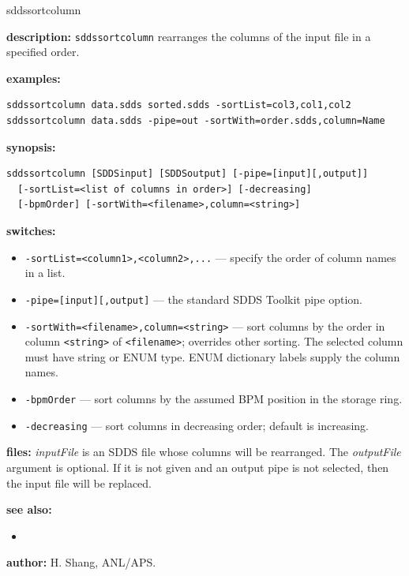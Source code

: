 \begin{sddsprog}{sddssortcolumn}
  \item \textbf{description:}
    \verb|sddssortcolumn| rearranges the columns of the input file in a specified order.
  \item \textbf{examples:}
    \begin{verbatim}
sddssortcolumn data.sdds sorted.sdds -sortList=col3,col1,col2
sddssortcolumn data.sdds -pipe=out -sortWith=order.sdds,column=Name
    \end{verbatim}
  \item \textbf{synopsis:}
    \begin{verbatim}
sddssortcolumn [SDDSinput] [SDDSoutput] [-pipe=[input][,output]]
  [-sortList=<list of columns in order>] [-decreasing]
  [-bpmOrder] [-sortWith=<filename>,column=<string>]
    \end{verbatim}
  \item \textbf{switches:}
    \begin{itemize}
      \item \verb|-sortList=<column1>,<column2>,...| --- specify the order of column names in a list.
      \item \verb|-pipe=[input][,output]| --- the standard SDDS Toolkit pipe option.
      \item \verb|-sortWith=<filename>,column=<string>| --- sort columns by the order in column \verb|<string>| of \verb|<filename>|; overrides other sorting. The selected column must have string or ENUM type. ENUM dictionary labels supply the column names.
      \item \verb|-bpmOrder| --- sort columns by the assumed BPM position in the storage ring.
      \item \verb|-decreasing| --- sort columns in decreasing order; default is increasing.
    \end{itemize}
  \item \textbf{files:}
    \emph{inputFile} is an SDDS file whose columns will be rearranged. The \emph{outputFile} argument is optional. If it is not given and an output pipe is not selected, then the input file will be replaced.
  \item \textbf{see also:}
    \begin{itemize}
      \item {}
    \end{itemize}
  \item \textbf{author:} H. Shang, ANL/APS.
\end{sddsprog}
